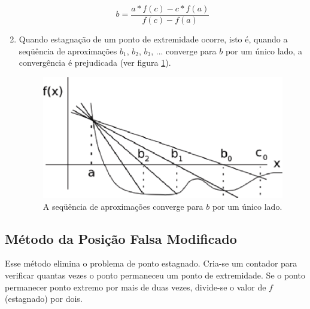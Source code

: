 \begin{enumerate}
\[ \displaystyle b = \frac{a \ast f(c) - c \ast f(a)}{f(c) - f(a)} \]

\item Quando estagnação de um ponto de extremidade ocorre, isto é, quando a seqüência de aproximações $b_{1}$, $b_{2}$, $b_{3}$, ... converge para $b$ por um único lado, a convergência é prejudicada (ver figura \ref{fig:posicaofalsa2}).

\begin{figure}[htb]
  \setlength{\abovecaptionskip}{20pt}
  \centering
  \includegraphics[scale=0.8]{capitulos/capitulo1/figuras/posicaofalsa2.eps}
  \caption{A seqüência de aproximações converge para $b$ por um único lado.}
  \label{fig:posicaofalsa2}
\end{figure}

\end{enumerate}

\subsection{Método da Posição Falsa Modificado}

Esse método elimina o problema de ponto estagnado. Cria-se um contador para verificar quantas vezes o ponto permaneceu um ponto de extremidade. Se o ponto permanecer ponto extremo por mais de duas vezes, divide-se o valor de $f$ (estagnado) por dois.

